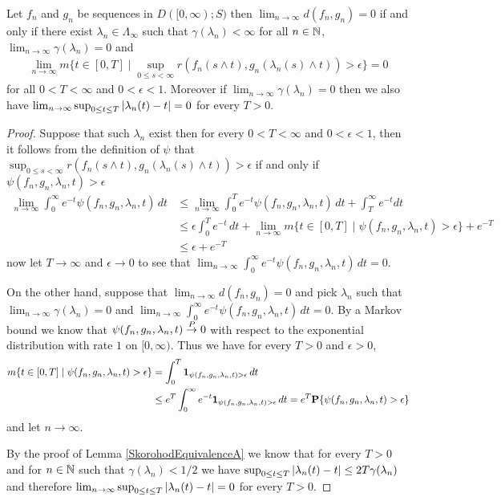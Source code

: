 \begin{lem}\label{SkorohodInfinityConvergenceToZero}Let $f_n$ and $g_n$ be sequences in $D([0,\infty); S)$ then $\lim_{n \to \infty} d(f_n, g_n) = 0$ if and only if there exist $\lambda_n \in \Lambda_\infty$ such
that $\gamma(\lambda_n) < \infty$ for all $n \in \mathbb{N}$, $\lim_{n \to \infty} \gamma(\lambda_n) = 0$ and 
\begin{align*}
\lim_{n \to \infty} m \lbrace t \in [0, T] \mid \sup_{0 \leq s < \infty} r(f_n(s \wedge t), g_n(\lambda_n(s) \wedge t)) > \epsilon \rbrace = 0
\end{align*} 
for all $0 < T < \infty$ and $0 < \epsilon < 1$.  Moreover if $\lim_{n \to \infty} \gamma(\lambda_n) = 0$ then we also have $\lim_{n \to \infty}   \sup_{0 \leq t \leq T} \left \vert \lambda_n(t) - t \right \vert = 0$ for every $T > 0$.
\end{lem}
\begin{proof}
Suppose that such $\lambda_n$ exist then for every $0 < T < \infty$ and $0 < \epsilon < 1$, then it follows from the definition of $\psi$ that $\sup_{0 \leq s < \infty} r(f_n(s \wedge t), g_n(\lambda_n(s) \wedge t)) > \epsilon$ if and only if $\psi(f_n,g_n, \lambda_n, t) > \epsilon$
\begin{align*}
\lim_{n \to \infty} \int_0^\infty e^{-t} \psi(f_n,g_n, \lambda_n, t) \, dt
&\leq \lim_{n \to \infty} \int_0^T e^{-t} \psi(f_n,g_n, \lambda_n, t) \, dt + \int_T^\infty e^{-t} dt \\
&\leq \epsilon \int_0^T e^{-t} \, dt + \lim_{n \to \infty} m \lbrace t \in [0, T] \mid \psi(f_n,g_n,\lambda_n,t) > \epsilon \rbrace + e^{-T} \\
&\leq  \epsilon + e^{-T}
\end{align*}
now let $T \to \infty$ and $\epsilon \to 0$ to see that $\lim_{n \to \infty} \int_0^\infty e^{-t} \psi(f_n,g_n, \lambda_n, t) \, dt = 0$.

On the other hand, suppose that $\lim_{n \to \infty} d(f_n, g_n) = 0$ and pick $\lambda_n$ such that $\lim_{n \to \infty} \gamma(\lambda_n) = 0$ and 
$\lim_{n \to \infty} \int_0^\infty e^{-t} \psi(f_n,g_n, \lambda_n, t) \, dt = 0$.  By a Markov bound we know that $\psi(f_n,g_n, \lambda_n, t)  \overset{P}\to 0$ with respect to
the exponential distribution with rate $1$ on $[0,\infty)$.  Thus we have for every $T > 0$ and $\epsilon > 0$,
\begin{align*}
m \lbrace t \in [0, T] \mid \psi(f_n,g_n,\lambda_n,t) > \epsilon \rbrace 
&= \int_0^T \textbf{1}_{\psi(f_n,g_n,\lambda_n,t) > \epsilon} \, dt \\
&\leq e^{T} \int_0^\infty e^{-t} \textbf{1}_{\psi(f_n,g_n,\lambda_n,t) > \epsilon} \, dt = e^T \textbf{P}\{\psi(f_n,g_n,\lambda_n,t) > \epsilon\} \\
\end{align*}
and let $n \to \infty$.

By the proof of Lemma \ref{SkorohodEquivalenceA} we know that for every $T > 0$ and for $n \in \mathbb{N}$ such that $\gamma(\lambda_n) < 1/2$ we have $\sup_{0 \leq t \leq T} \left \vert \lambda_n(t) - t \right \vert \leq 2T \gamma(\lambda_n)$ and therefore $\lim_{n \to \infty} \sup_{0 \leq t \leq T} \left \vert \lambda_n(t) - t \right \vert = 0$ for every $T > 0$.
\end{proof}

